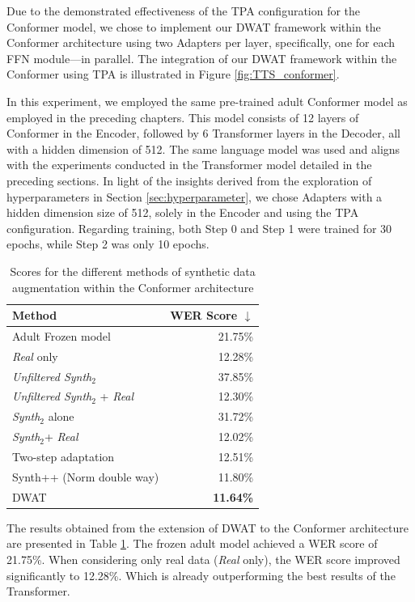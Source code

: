 Due to the demonstrated effectiveness of the \ac{TPA} configuration for the Conformer model, we chose to implement our \ac{DWAT} framework within the Conformer architecture using two Adapters per layer, specifically, one for each \ac{FFN} module—in parallel. The integration of our \ac{DWAT} framework within the Conformer using \ac{TPA} is illustrated in Figure \ref{fig:TTS_conformer}.

In this experiment, we employed the same pre-trained adult Conformer model as employed in the preceding chapters. This model consists of 12 layers of Conformer in the Encoder, followed by 6 Transformer layers in the Decoder, all with a hidden dimension of 512. The same language model was used and aligns with the experiments conducted in the Transformer model detailed in the preceding sections. In light of the insights derived from the exploration of hyperparameters in Section \ref{sec:hyperparameter}, we chose Adapters with a hidden dimension size of 512, solely in the Encoder and using the \ac{TPA} configuration. Regarding training, both Step 0 and Step 1 were trained for 30 epochs, while Step 2 was only 10 epochs.

\begin{table}[h]
    \centering
    \begin{tabular}{lr}
        \toprule
        Method & WER Score $\downarrow$ \\
        \midrule
        Adult Frozen model & 21.75\% \\
        \textit{Real} only & 12.28\% \\ \hline
        \textit{Unfiltered Synth$_2$} & 37.85\% \\
        \textit{Unfiltered Synth$_2$} + \textit{Real} & 12.30\% \\ 
        \textit{Synth$_2$} alone & 31.72\% \\
        \textit{Synth$_2$}+ \textit{Real} & 12.02\% \\ 
        Two-step adaptation & 12.51\% \\ \hline
        Synth++ (Norm double way) & 11.80\% \\
        DWAT & \textbf{11.64\%} \\
        \bottomrule
    \end{tabular}
    \caption{Scores for the different methods of synthetic data augmentation within the Conformer architecture}
    \label{tab:DWAT_conformer}
\end{table}

The results obtained from the extension of \ac{DWAT} to the Conformer architecture are presented in Table \ref{tab:DWAT_conformer}. The frozen adult model achieved a \ac{WER} score of 21.75\%. When considering only real data (\textit{Real} only), the \ac{WER} score improved significantly to 12.28\%. Which is already outperforming the best results of the Transformer.


